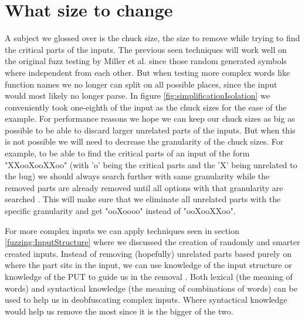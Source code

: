 \section{What size to change}
\label{inputReduction:Chucksize}
A subject we glossed over is the chuck size, the size to remove while trying to find the critical parts of the inputs. 
The previous seen techniques will work well on the original fuzz testing by Miller et al. \cite{4originalFuzzingUnixUtils} since those random generated symbols where independent from each other. But when testing more complex words like function names we no longer can split on all possible places, since the input would most likely no longer parse. 
In figure \ref{fig:simplificationIsolation} we conveniently took one-eighth of the input as the chuck sizes for the ease of the example. For performance reasons we hope we can keep our chuck sizes as big as possible to be able to discard larger unrelated parts of the inputs. But when this is not possible we will need to decrease the granularity of the chuck sizes.
For example, to be able to find the critical parts of an input of the form "XXooXooXXoo" (with 'o' being the critical parts and the 'X' being unrelated to the bug) we should always search further with same granularity while the removed parts are already removed until all options with that granularity are searched \cite{bookZellerwhyProgramsFail}. This will make sure that we eliminate all unrelated parts with the specific granularity and get "ooXoooo" instead of "ooXooXXoo". 

For more complex inputs we can apply techniques seen in section \ref{fuzzing:InputStructure} where we discussed the creation of randomly and smarter created inputs. Instead of removing (hopefully) unrelated parts based purely on where the part sits in the input, we can use knowledge of the input structure or knowledge of the PUT to guide us in the removal \cite{bookZellerwhyProgramsFail}. Both lexical (the meaning of words) and syntactical knowledge (the meaning of combinations of words) can be used to help us in deobfuscating complex inputs. Where syntactical knowledge would help us remove the most since it is the bigger of the two.

